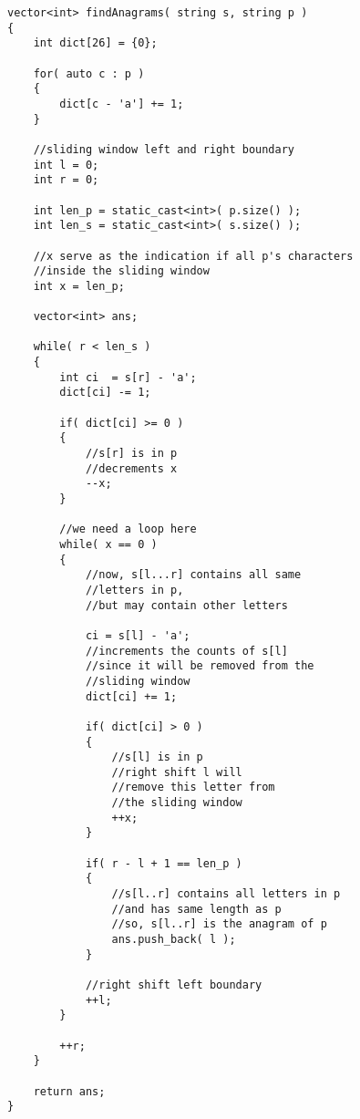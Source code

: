 \setcounter{lstlisting}{0}
\begin{lstlisting}[style=customc, caption={Sliding Window}]
vector<int> findAnagrams( string s, string p )
{
    int dict[26] = {0};

    for( auto c : p )
    {
        dict[c - 'a'] += 1;
    }

    //sliding window left and right boundary
    int l = 0;
    int r = 0;

    int len_p = static_cast<int>( p.size() );
    int len_s = static_cast<int>( s.size() );

    //x serve as the indication if all p's characters
    //inside the sliding window
    int x = len_p;

    vector<int> ans;

    while( r < len_s )
    {
        int ci  = s[r] - 'a';
        dict[ci] -= 1;

        if( dict[ci] >= 0 )
        {
            //s[r] is in p
            //decrements x
            --x;
        }

        //we need a loop here
        while( x == 0 )
        {
            //now, s[l...r] contains all same
            //letters in p,
            //but may contain other letters

            ci = s[l] - 'a';
            //increments the counts of s[l]
            //since it will be removed from the
            //sliding window
            dict[ci] += 1;

            if( dict[ci] > 0 )
            {
                //s[l] is in p
                //right shift l will
                //remove this letter from
                //the sliding window
                ++x;
            }

            if( r - l + 1 == len_p )
            {
                //s[l..r] contains all letters in p
                //and has same length as p
                //so, s[l..r] is the anagram of p
                ans.push_back( l );
            }

            //right shift left boundary
            ++l;
        }

        ++r;
    }

    return ans;
}
\end{lstlisting}